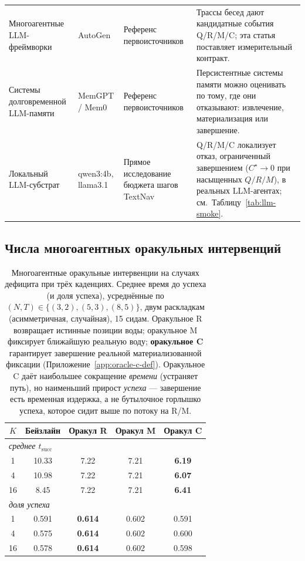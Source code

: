 \documentclass{article}
\begin{document}
\begin{table}[h]
\begin{tabular}{p{2.45cm}p{2.55cm}p{2.7cm}p{4.0cm}}
Многоагентные LLM-фреймворки & AutoGen \citep{wu2023autogen} & Референс первоисточников & Трассы бесед дают кандидатные события Q/R/M/C; эта статья поставляет измерительный контракт. \\
Системы долговременной LLM-памяти & MemGPT / Mem0 \citep{packer2023memgpt,chhikara2025mem0} & Референс первоисточников & Персистентные системы памяти можно оценивать по тому, где они отказывают: извлечение, материализация или завершение. \\
Локальный LLM-субстрат & qwen3:4b, llama3.1 & Прямое исследование бюджета шагов TextNav & Q/R/M/C локализует отказ, ограниченный завершением ($C^\star{\to}0$ при насыщенных $Q/R/M$), в реальных LLM-агентах; см.\ Таблицу~\ref{tab:llm-smoke}. \\
\bottomrule
\end{tabular}
\end{table}

\subsection{Числа многоагентных оракульных интервенций}
\label{app:multi-oracle}

\begin{table}[h]
\caption{Многоагентные оракульные интервенции на случаях дефицита при трёх каденциях. Среднее время до успеха (и доля успеха), усреднённые по $(N,T)\in\{(3,2),(5,3),(8,5)\}$, двум раскладкам (асимметричная, случайная), 15 сидам. Оракульное R возвращает истинные позиции воды; оракульное M фиксирует ближайшую реальную воду; \textbf{оракульное C} гарантирует завершение реальной материализованной фиксации (Приложение~\ref{app:oracle-c-def}). Оракульное C даёт наибольшее сокращение \emph{времени} (устраняет путь), но наименьший прирост \emph{успеха} --- завершение есть временная издержка, а не бутылочное горлышко успеха, которое сидит выше по потоку на R/M.}
\label{tab:multi-agent-oracle}
\centering
\small
\begin{tabular}{c c c c c}
\toprule
$K$ & Бейзлайн & Оракул R & Оракул M & Оракул C \\
\midrule
\multicolumn{5}{l}{\emph{среднее $t_{\mathrm{succ}}$}}\\
1  & 10.33 & 7.22 & 7.21 & \textbf{6.19} \\
4  & 10.98 & 7.22 & 7.21 & \textbf{6.07} \\
16 &  8.45 & 7.22 & 7.21 & \textbf{6.41} \\
\midrule
\multicolumn{5}{l}{\emph{доля успеха}}\\
1  & 0.591 & \textbf{0.614} & 0.602 & 0.591 \\
4  & 0.575 & \textbf{0.614} & 0.602 & 0.600 \\
16 & 0.578 & \textbf{0.614} & 0.602 & 0.598 \\
\bottomrule
\end{tabular}
\end{table}
\end{document}
